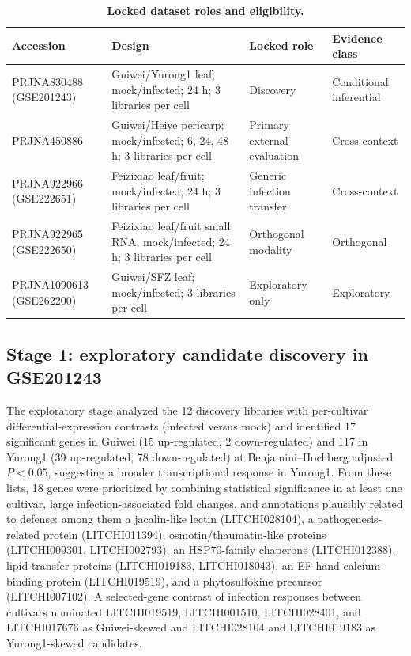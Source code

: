 \documentclass[referee,pdflatex,sn-basic,Numbered]{sn-jnl}
\begin{document}
\begin{table}[htbp]
\centering
\caption{\textbf{Locked dataset roles and eligibility.}}
\label{tab:roles}
\small
\begin{tabular}{@{}p{3.2cm}p{5.6cm}p{3.3cm}p{2.6cm}@{}}
\toprule
\textbf{Accession} & \textbf{Design} & \textbf{Locked role} & \textbf{Evidence class} \\
\midrule
PRJNA830488 (GSE201243) & Guiwei/Yurong1 leaf; mock/infected; 24 h; 3 libraries per cell & Discovery & Conditional inferential \\
PRJNA450886 & Guiwei/Heiye pericarp; mock/infected; 6, 24, 48 h; 3 libraries per cell & Primary external evaluation & Cross-context \\
PRJNA922966 (GSE222651) & Feizixiao leaf/fruit; mock/infected; 24 h; 3 libraries per cell & Generic infection transfer & Cross-context \\
PRJNA922965 (GSE222650) & Feizixiao leaf/fruit small RNA; mock/infected; 24 h; 3 libraries per cell & Orthogonal modality & Orthogonal \\
PRJNA1090613 (GSE262200) & Guiwei/SFZ leaf; mock/infected; 3 libraries per cell & Exploratory only & Exploratory \\
\bottomrule
\end{tabular}
\end{table}

\subsection{Stage 1: exploratory candidate discovery in GSE201243}

The exploratory stage analyzed the 12 discovery libraries with per-cultivar differential-expression contrasts (infected versus mock) and identified 17 significant genes in Guiwei (15 up-regulated, 2 down-regulated) and 117 in Yurong1 (39 up-regulated, 78 down-regulated) at Benjamini--Hochberg adjusted $P<0.05$, suggesting a broader transcriptional response in Yurong1. From these lists, 18 genes were prioritized by combining statistical significance in at least one cultivar, large infection-associated fold changes, and annotations plausibly related to defense: among them a jacalin-like lectin (LITCHI028104), a pathogenesis-related protein (LITCHI011394), osmotin/thaumatin-like proteins (LITCHI009301, LITCHI002793), an HSP70-family chaperone (LITCHI012388), lipid-transfer proteins (LITCHI019183, LITCHI018043), an EF-hand calcium-binding protein (LITCHI019519), and a phytosulfokine precursor (LITCHI007102). A selected-gene contrast of infection responses between cultivars nominated LITCHI019519, LITCHI001510, LITCHI028401, and LITCHI017676 as Guiwei-skewed and LITCHI028104 and LITCHI019183 as Yurong1-skewed candidates.
\end{document}

